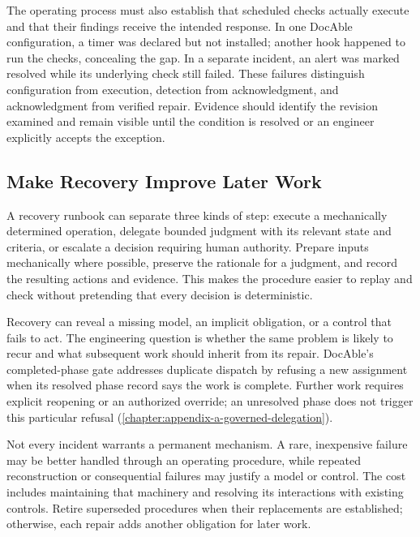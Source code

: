 The operating process must also establish that scheduled checks actually execute and that their findings receive the intended response. In one DocAble configuration, a timer was declared but not installed; another hook happened to run the checks, concealing the gap. In a separate incident, an alert was marked resolved while its underlying check still failed. These failures distinguish configuration from execution, detection from acknowledgment, and acknowledgment from verified repair. Evidence should identify the revision examined and remain visible until the condition is resolved or an engineer explicitly accepts the exception.

\subsection{Make Recovery Improve Later Work}\label{heading:make-recovery-improve-later-work}


A recovery runbook can separate three kinds of step: execute a mechanically determined operation, delegate bounded judgment with its relevant state and criteria, or escalate a decision requiring human authority. Prepare inputs mechanically where possible, preserve the rationale for a judgment, and record the resulting actions and evidence. This makes the procedure easier to replay and check without pretending that every decision is deterministic.

Recovery can reveal a missing model, an implicit obligation, or a control that fails to act. The engineering question is whether the same problem is likely to recur and what subsequent work should inherit from its repair. DocAble's completed-phase gate addresses duplicate dispatch by refusing a new assignment when its resolved phase record says the work is complete. Further work requires explicit reopening or an authorized override; an unresolved phase does not trigger this particular refusal (\autoref{chapter:appendix-a-governed-delegation}).

Not every incident warrants a permanent mechanism. A rare, inexpensive failure may be better handled through an operating procedure, while repeated reconstruction or consequential failures may justify a model or control. The cost includes maintaining that machinery and resolving its interactions with existing controls. Retire superseded procedures when their replacements are established; otherwise, each repair adds another obligation for later work.
